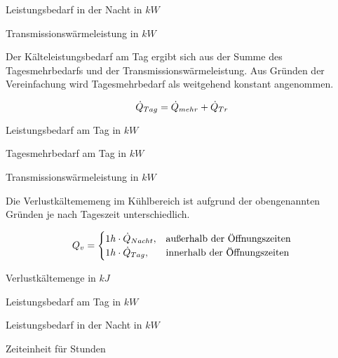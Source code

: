 \begin{description}[\dth]

	\item[$\pnacht$] Leistungsbedarf in der Nacht in $kW$
	\item[$\ptrans$] Transmissionswärmeleistung in $kW$

\end{description}
\vspace{0.5cm}


Der K\"alteleistungsbedarf am Tag ergibt sich aus der Summe des Tagesmehrbedarfs
und der Transmissionswärmeleistung. Aus Gründen der Vereinfachung wird
Tagesmehrbedarf als weitgehend konstant angenommen.

\begin{equation}
	\ptag = \pmehr + \ptrans
\label{ptag}
\end{equation}

\begin{description}[\dth]

	\item[$\ptag$] Leistungsbedarf am Tag in $kW$
	\item[$\pmehr$] Tagesmehrbedarf am Tag in $kW$
	\item[$\ptrans$] Transmissionswärmeleistung in $kW$

\end{description}
\vspace{0.5cm}

Die Verlustk\"altememeng im K\"uhlbereich ist aufgrund der obengenannten
Gr\"unden je nach Tageszeit unterschiedlich.

\begin{equation}
	Q_v = \begin{cases}
	1h \cdot \pnacht, & \text{au\ss erhalb der \"Offnungszeiten}\\
	1h \cdot \ptag, & \text{innerhalb der \"Offnungszeiten}
	\end{cases}
\label{qv}
\end{equation}

\begin{description}[\dth]

	\item[$Q_v$] Verlustk\"altemenge in $kJ$
	\item[$\ptag$] Leistungsbedarf am Tag in $kW$
	\item[$\pnacht$] Leistungsbedarf in der Nacht in $kW$
	\item[$h$] Zeiteinheit f\"ur Stunden

\end{description}
\vspace{0.5cm}


